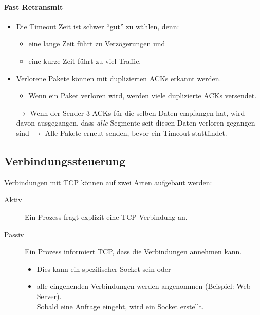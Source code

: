                 \paragraph{Fast Retransmit}
                    \begin{itemize}
                    	\item Die Timeout Zeit ist schwer \enquote{gut} zu wählen, denn:
	                    	\begin{itemize}
	                    		\item eine lange Zeit führt zu Verzögerungen und
	                    		\item eine kurze Zeit führt zu viel Traffic.
	                    	\end{itemize}
	                    \item Verlorene Pakete können mit duplizierten ACKs erkannt werden.
		                    \begin{itemize}
		                    	\item Wenn ein Paket verloren wird, werden viele duplizierte ACKs versendet.
		                    \end{itemize}
		                \item[\(\rightarrow\)] Wenn der Sender 3 ACKs für die selben Daten empfangen hat, wird davon ausgegangen, dass \textit{alle} Segmente seit diesen Daten verloren gegangen sind \(\rightarrow\) Alle Pakete erneut senden, bevor ein Timeout stattfindet.
                    \end{itemize}

        \subsection{Verbindungssteuerung}
            Verbindungen mit TCP können auf zwei Arten aufgebaut werden:
            \begin{description}
            	\item[Aktiv] Ein Prozess fragt explizit eine TCP-Verbindung an.
            	\item[Passiv] Ein Prozess informiert TCP, dass die Verbindungen annehmen kann.
                	\begin{itemize}
                		\item Dies kann ein spezifischer Socket sein oder
                		\item alle eingehenden Verbindungen werden angenommen (Beispiel: Web Server). \\ Sobald eine Anfrage eingeht, wird ein Socket erstellt.
                	\end{itemize}
            \end{description}
            
